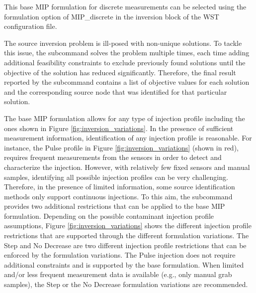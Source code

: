 This base MIP formulation for
discrete measurements can be selected using the formulation option of
MIP\_discrete in the inversion block of the  WST
configuration file.

The source inversion problem is ill-posed with non-unique
solutions. To tackle this issue, the  subcommand solves
the problem multiple times, each time adding additional feasibility constraints
to exclude previously found solutions until the objective of the solution
has reduced significantly. Therefore, the final result reported by
the  subcommand contains a list of objective values
for each solution and the corresponding source node that was identified
for that particular solution. 

The base MIP formulation allows for any type of injection profile including the ones
shown in Figure \ref{fig:inversion_variations}. In the presence of sufficient 
measurement information, identification of any injection profile is reasonable.    
For instance, the Pulse profile in Figure \ref{fig:inversion_variations} (shown in red),
requires frequent measurements from the sensors in order to detect and characterize the injection. 
However, with relatively few fixed sensors and manual samples, identifying all
possible injection profiles can be very challenging. 
Therefore, in the presence of limited information, some source identification methods
only support continuous injections.   
To this aim, the  subcommand provides two additional restrictions that can be
applied to the base MIP formulation. 
Depending on the possible contaminant injection profile assumptions,
Figure \ref{fig:inversion_variations} shows the different injection
profile restrictions that are supported through the different
formulation variations. The Step and No Decrease are two different 
injection profile restrictions that can be enforced by the formulation 
variations. The Pulse injection does not require additional constraints 
and is supported by the base formulation. When limited and/or less frequent measurement
data is available (e.g., only manual grab samples), the Step or the No
Decrease formulation variations are recommended.

